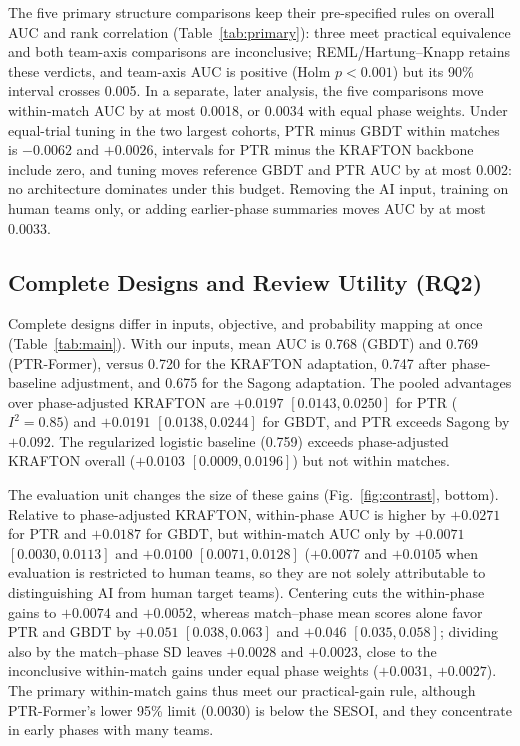\documentclass[sigconf,anonymous,nonacm]{acmart}
\begin{document}

The five primary structure comparisons keep their pre-specified rules on overall AUC and rank correlation (Table~\ref{tab:primary}): three meet practical equivalence and both team-axis comparisons are inconclusive; REML/Hartung--Knapp retains these verdicts, and team-axis AUC is positive (Holm $p<0.001$) but its 90\% interval crosses 0.005. In a separate, later analysis, the five comparisons move within-match AUC by at most 0.0018, or 0.0034 with equal phase weights. Under equal-trial tuning in the two largest cohorts, PTR minus GBDT within matches is $-0.0062$ and $+0.0026$, intervals for PTR minus the KRAFTON backbone include zero, and tuning moves reference GBDT and PTR AUC by at most 0.002: no architecture dominates under this budget. Removing the AI input, training on human teams only, or adding earlier-phase summaries moves AUC by at most 0.0033.

\subsection{Complete Designs and Review Utility (RQ2)}
\label{sec:results:designs}

Complete designs differ in inputs, objective, and probability mapping at once (Table~\ref{tab:main}). With our inputs, mean AUC is 0.768 (GBDT) and 0.769 (PTR-Former), versus 0.720 for the KRAFTON adaptation, 0.747 after phase-baseline adjustment, and 0.675 for the Sagong adaptation. The pooled advantages over phase-adjusted KRAFTON are $+0.0197$ $[0.0143,\allowbreak 0.0250]$ for PTR ($I^2=0.85$) and $+0.0191$ $[0.0138,\allowbreak 0.0244]$ for GBDT, and PTR exceeds Sagong by $+0.092$. The regularized logistic baseline (0.759) exceeds phase-adjusted KRAFTON overall ($+0.0103$ $[0.0009,\allowbreak 0.0196]$) but not within matches.

The evaluation unit changes the size of these gains (Fig.~\ref{fig:contrast}, bottom). Relative to phase-adjusted KRAFTON, within-phase AUC is higher by $+0.0271$ for PTR and $+0.0187$ for GBDT, but within-match AUC only by $+0.0071$ $[0.0030,\allowbreak 0.0113]$ and $+0.0100$ $[0.0071,\allowbreak 0.0128]$ ($+0.0077$ and $+0.0105$ when evaluation is restricted to human teams, so they are not solely attributable to distinguishing AI from human target teams). Centering cuts the within-phase gains to $+0.0074$ and $+0.0052$, whereas match--phase mean scores alone favor PTR and GBDT by $+0.051$ $[0.038,\allowbreak 0.063]$ and $+0.046$ $[0.035,\allowbreak 0.058]$; dividing also by the match--phase SD leaves $+0.0028$ and $+0.0023$, close to the inconclusive within-match gains under equal phase weights ($+0.0031$, $+0.0027$). The primary within-match gains thus meet our practical-gain rule, although PTR-Former's lower 95\% limit (0.0030) is below the SESOI, and they concentrate in early phases with many teams.
\end{document}
